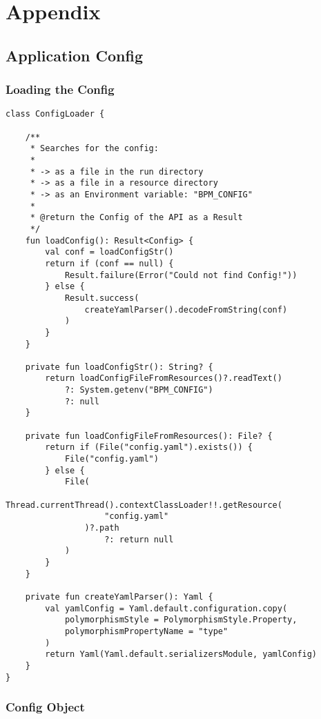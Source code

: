 \chapter{Appendix}

\section{Application Config}

\subsection{Loading the Config}

\begin{verbatim}
class ConfigLoader {

    /**
     * Searches for the config:
     *
     * -> as a file in the run directory
     * -> as a file in a resource directory
     * -> as an Environment variable: "BPM_CONFIG"
     *
     * @return the Config of the API as a Result
     */
    fun loadConfig(): Result<Config> {
        val conf = loadConfigStr()
        return if (conf == null) {
            Result.failure(Error("Could not find Config!"))
        } else {
            Result.success(
                createYamlParser().decodeFromString(conf)
            )
        }
    }

    private fun loadConfigStr(): String? {
        return loadConfigFileFromResources()?.readText()
            ?: System.getenv("BPM_CONFIG")
            ?: null
    }

    private fun loadConfigFileFromResources(): File? {
        return if (File("config.yaml").exists()) {
            File("config.yaml")
        } else {
            File(
                Thread.currentThread().contextClassLoader!!.getResource(
                    "config.yaml"
                )?.path
                    ?: return null
            )
        }
    }

    private fun createYamlParser(): Yaml {
        val yamlConfig = Yaml.default.configuration.copy(
            polymorphismStyle = PolymorphismStyle.Property,
            polymorphismPropertyName = "type"
        )
        return Yaml(Yaml.default.serializersModule, yamlConfig)
    }
}

\end{verbatim}
\label{code:App_conf_loading}

\subsection{Config Object}

